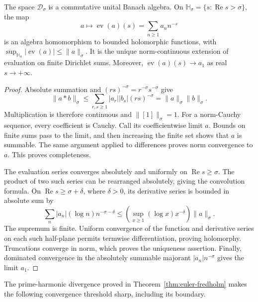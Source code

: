 \begin{lemma}
\label{lem:da-evaluation}
The space $\mathscr D_\sigma$ is a commutative unital Banach algebra.
On $\mathbb H_\sigma=\{s:\operatorname{Re}s>\sigma\}$, the map
\[
 a\longmapsto\operatorname{ev}(a)(s)=\sum_{n\geq1}a_nn^{-s}
\]
is an algebra homomorphism to bounded holomorphic functions, with
$\sup_{\mathbb H_\sigma}|\operatorname{ev}(a)|\leq\|a\|_\sigma$.
It is the unique norm-continuous extension of evaluation on finite
Dirichlet sums. Moreover,
$\operatorname{ev}(a)(s)\to a_1$ as real $s\to+\infty$.
\end{lemma}
\begin{proof}
Absolute summation and $(rs)^{-\sigma}=r^{-\sigma}s^{-\sigma}$ give
\[
 \|a*b\|_\sigma
 \leq\sum_{r,s\geq1}|a_r||b_s|(rs)^{-\sigma}
 =\|a\|_\sigma\|b\|_\sigma.
\]
Multiplication is therefore continuous and $\|[1]\|_\sigma=1$.
For a norm-Cauchy sequence, every coefficient is Cauchy. Call its
coefficientwise limit $a$. Bounds on finite sums pass to the limit,
and then increasing the finite set shows that $a$ is summable.
The same argument applied to differences proves norm convergence
to $a$. This proves completeness.

The evaluation series converges absolutely and uniformly on
$\operatorname{Re}s\geq\sigma$. The product of two such series can
be rearranged absolutely, giving the convolution formula.
On $\operatorname{Re}s\geq\sigma+\delta$, where $\delta>0$,
its derivative series is bounded in absolute sum by
\[
 \sum_n |a_n|(\log n)n^{-\sigma-\delta}
 \leq\left(\sup_{x\geq1}(\log x)x^{-\delta}\right)\|a\|_\sigma.
\]
The supremum is finite. Uniform convergence of the function and
derivative series on each such half-plane permits termwise
differentiation, proving holomorphy. Truncations converge in norm,
which proves the uniqueness assertion. Finally, dominated
convergence in the absolutely summable majorant
$|a_n|n^{-\sigma}$ gives the limit $a_1$.
\end{proof}

The prime-harmonic divergence proved in
Theorem~\ref{thm:euler-fredholm} makes the following convergence
threshold sharp, including its boundary.

